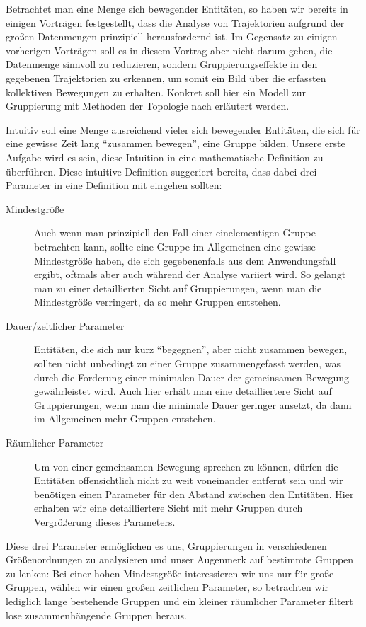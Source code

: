 Betrachtet man eine Menge sich bewegender Entitäten, so haben wir bereits in einigen Vorträgen festgestellt, dass die Analyse von Trajektorien aufgrund der großen Datenmengen prinzipiell herausfordernd ist.
Im Gegensatz zu einigen vorherigen Vorträgen soll es in diesem Vortrag aber nicht darum gehen, die Datenmenge sinnvoll zu reduzieren, sondern Gruppierungseffekte in den gegebenen Trajektorien zu erkennen, um somit ein Bild über die erfassten kollektiven Bewegungen zu erhalten.
Konkret soll hier ein Modell zur Gruppierung mit Methoden der Topologie nach \textcite{buchin2015} erläutert werden.

Intuitiv soll eine Menge ausreichend vieler sich bewegender Entitäten, die sich für eine gewisse Zeit lang \enquote{zusammen bewegen}, eine Gruppe bilden.
Unsere erste Aufgabe wird es sein, diese Intuition in eine mathematische Definition zu überführen.
Diese intuitive Definition suggeriert bereits, dass dabei drei Parameter in eine Definition mit eingehen sollten:
\begin{description}
	\item[Mindestgröße] Auch wenn man prinzipiell den Fall einer einelementigen Gruppe betrachten kann, sollte eine Gruppe im Allgemeinen eine gewisse Mindestgröße haben, die sich gegebenenfalls aus dem Anwendungsfall ergibt, oftmals aber auch während der Analyse variiert wird.
	So gelangt man zu einer detaillierten Sicht auf Gruppierungen, wenn man die Mindestgröße verringert, da so mehr Gruppen entstehen.
	\item[Dauer/zeitlicher Parameter] Entitäten, die sich nur kurz \enquote{begegnen}, aber nicht zusammen bewegen, sollten nicht unbedingt zu einer Gruppe zusammengefasst werden, was durch die Forderung einer minimalen Dauer der gemeinsamen Bewegung gewährleistet wird.
	Auch hier erhält man eine detailliertere Sicht auf Gruppierungen, wenn man die minimale Dauer geringer ansetzt, da dann im Allgemeinen mehr Gruppen entstehen.
	\item[Räumlicher Parameter] Um von einer gemeinsamen Bewegung sprechen zu können, dürfen die Entitäten offensichtlich nicht zu weit voneinander entfernt sein und wir benötigen einen Parameter für den Abstand zwischen den Entitäten.
	Hier erhalten wir eine detailliertere Sicht mit mehr Gruppen durch Vergrößerung dieses Parameters.
\end{description}
Diese drei Parameter ermöglichen es uns, Gruppierungen in verschiedenen Größenordnungen zu analysieren und unser Augenmerk auf bestimmte Gruppen zu lenken: Bei einer hohen Mindestgröße interessieren wir uns nur für große Gruppen, wählen wir einen großen zeitlichen Parameter, so betrachten wir lediglich lange bestehende Gruppen und ein kleiner räumlicher Parameter filtert lose zusammenhängende Gruppen heraus.


